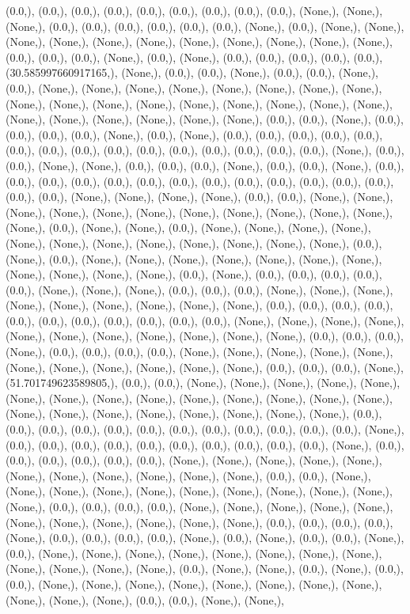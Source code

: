 \documentclass{article}
\begin{document}
(0.0,), (0.0,), (0.0,), (0.0,), (0.0,), (0.0,), (0.0,), (0.0,), (0.0,), (None,), (None,), (None,), (0.0,), (0.0,), (0.0,), (0.0,), (0.0,), (0.0,), (None,), (0.0,), (None,), (None,), (None,), (None,), (None,), (None,), (None,), (None,), (None,), (None,), (None,), (0.0,), (0.0,), (0.0,), (None,), (0.0,), (None,), (0.0,), (0.0,), (0.0,), (0.0,), (0.0,), (30.585997660917165,), (None,), (0.0,), (0.0,), (None,), (0.0,), (0.0,), (None,), (0.0,), (None,), (None,), (None,), (None,), (None,), (None,), (None,), (None,), (None,), (None,), (None,), (None,), (None,), (None,), (None,), (None,), (None,), (None,), (None,), (None,), (None,), (None,), (None,), (0.0,), (0.0,), (None,), (0.0,), (0.0,), (0.0,), (0.0,), (None,), (0.0,), (None,), (0.0,), (0.0,), (0.0,), (0.0,), (0.0,), (0.0,), (0.0,), (0.0,), (0.0,), (0.0,), (0.0,), (0.0,), (0.0,), (0.0,), (0.0,), (None,), (0.0,), (0.0,), (None,), (None,), (0.0,), (0.0,), (0.0,), (None,), (0.0,), (0.0,), (None,), (0.0,), (0.0,), (0.0,), (0.0,), (0.0,), (0.0,), (0.0,), (0.0,), (0.0,), (0.0,), (0.0,), (0.0,), (0.0,), (0.0,), (0.0,), (None,), (None,), (None,), (None,), (0.0,), (0.0,), (None,), (None,), (None,), (None,), (None,), (None,), (None,), (None,), (None,), (None,), (None,), (None,), (0.0,), (None,), (None,), (0.0,), (None,), (None,), (None,), (None,), (None,), (None,), (None,), (None,), (None,), (None,), (None,), (None,), (0.0,), (None,), (0.0,), (None,), (None,), (None,), (None,), (None,), (None,), (None,), (None,), (None,), (None,), (None,), (0.0,), (None,), (0.0,), (0.0,), (0.0,), (0.0,), (0.0,), (None,), (None,), (None,), (0.0,), (0.0,), (0.0,), (None,), (None,), (None,), (None,), (None,), (None,), (None,), (None,), (None,), (0.0,), (0.0,), (0.0,), (0.0,), (0.0,), (0.0,), (0.0,), (0.0,), (0.0,), (0.0,), (0.0,), (None,), (None,), (None,), (None,), (None,), (None,), (None,), (None,), (None,), (None,), (None,), (0.0,), (0.0,), (0.0,), (None,), (0.0,), (0.0,), (0.0,), (0.0,), (None,), (None,), (None,), (None,), (None,), (None,), (None,), (None,), (None,), (None,), (None,), (0.0,), (0.0,), (0.0,), (None,), (51.701749623589805,), (0.0,), (0.0,), (None,), (None,), (None,), (None,), (None,), (None,), (None,), (None,), (None,), (None,), (None,), (None,), (None,), (None,), (None,), (None,), (None,), (None,), (None,), (None,), (None,), (None,), (0.0,), (0.0,), (0.0,), (0.0,), (0.0,), (0.0,), (0.0,), (0.0,), (0.0,), (0.0,), (0.0,), (0.0,), (None,), (0.0,), (0.0,), (0.0,), (0.0,), (0.0,), (0.0,), (0.0,), (0.0,), (0.0,), (0.0,), (None,), (0.0,), (0.0,), (0.0,), (0.0,), (0.0,), (0.0,), (None,), (None,), (None,), (None,), (None,), (None,), (None,), (None,), (None,), (None,), (None,), (0.0,), (0.0,), (None,), (None,), (None,), (None,), (None,), (None,), (None,), (None,), (None,), (None,), (None,), (0.0,), (0.0,), (0.0,), (0.0,), (None,), (None,), (None,), (None,), (None,), (None,), (None,), (None,), (None,), (None,), (None,), (0.0,), (0.0,), (0.0,), (0.0,), (None,), (0.0,), (0.0,), (0.0,), (0.0,), (None,), (0.0,), (None,), (0.0,), (0.0,), (None,), (0.0,), (None,), (None,), (None,), (None,), (None,), (None,), (None,), (None,), (None,), (None,), (None,), (None,), (0.0,), (None,), (None,), (0.0,), (None,), (0.0,), (0.0,), (None,), (None,), (None,), (None,), (None,), (None,), (None,), (None,), (None,), (None,), (None,), (0.0,), (0.0,), (None,), (None,), 
\end{document}
